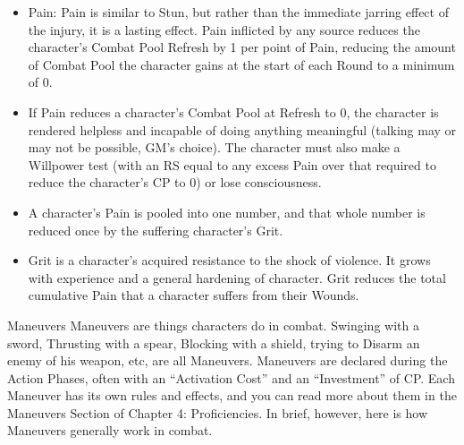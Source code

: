 \documentclass[oneside,11pt,english]{book}
\begin{document}
 
\begin{itemize}
\item Pain: Pain is similar to Stun, but rather than the immediate jarring effect of the injury, it is a 
lasting effect. Pain inflicted by any source reduces the character’s Combat Pool Refresh by 1 per 
point of Pain, reducing the amount of Combat Pool the character gains at the start of each Round 
to a minimum of 0. 
\item If Pain reduces a character’s Combat Pool at Refresh to 0, the character is rendered helpless and 
incapable of doing anything meaningful (talking may or may not be possible, GM’s choice). The 
character must also make a Willpower test (with an RS equal to any excess Pain over that 
required to reduce the character’s CP to 0) or lose consciousness. 
\item A character’s Pain is pooled into one number, and that whole number is reduced once by the 
suffering character’s Grit. 
\item Grit is a character's acquired resistance to the shock of violence. It grows with experience and a 
general hardening of character. Grit reduces the total cumulative Pain that a character suffers 
from their Wounds. 
\end{itemize}
 

Maneuvers 
Maneuvers are things characters do in combat. Swinging with a sword, Thrusting with a spear, Blocking 
with a shield, trying to Disarm an enemy of his weapon, etc, are all Maneuvers. Maneuvers are declared 
during the Action Phases, often with an “Activation Cost” and an “Investment” of CP. Each Maneuver 
has its own rules and effects, and you can read more about them in the Maneuvers Section of Chapter 4: 
Proficiencies. In brief, however, here is how Maneuvers generally work in combat. 
\end{document}
